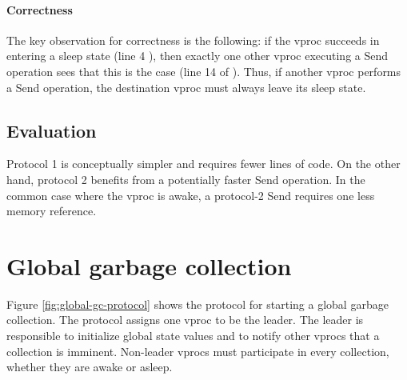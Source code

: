 \documentclass[11pt]{article}
\begin{document}
\paragraph{Correctness}
The key observation for correctness is the following: if the vproc succeeds in 
entering a sleep state (line 4 ), then exactly one other vproc executing a Send operation sees 
that this is the case (line 14 of ).
Thus, if another vproc performs a Send operation, the destination vproc must always
leave its sleep state.

\subsection{Evaluation}\label{sec:evaluation}
Protocol 1 is conceptually simpler and requires fewer lines of code.
On the other hand, protocol 2 benefits from a potentially faster Send operation.
In the common case where the vproc is awake, a protocol-2 Send requires one less memory reference.

\section{Global garbage collection}\label{sec:global-gc}
Figure \ref{fig:global-gc-protocol} shows the protocol for starting a global garbage
collection.
The protocol assigns one vproc to be the leader.
The leader is responsible to initialize global state values and to notify other vprocs
that a collection is imminent.
Non-leader vprocs must participate in every collection, whether they are awake or asleep.
\end{document}
